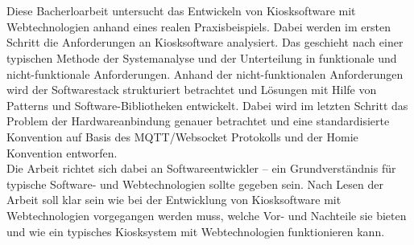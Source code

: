 \chapter{\abstractname}

Diese Bacherloarbeit untersucht das Entwickeln von Kiosksoftware mit Webtechnologien
anhand eines realen Praxisbeispiels. Dabei werden im ersten Schritt die Anforderungen
an Kiosksoftware analysiert. Das geschieht nach einer typischen Methode der Systemanalyse
und der Unterteilung in funktionale und nicht-funktionale Anforderungen. 
Anhand der nicht-funktionalen Anforderungen
wird der Softwarestack strukturiert betrachtet und Lösungen mit Hilfe von Patterns und 
Software-Bibliotheken entwickelt. Dabei wird im letzten Schritt das Problem der
Hardwareanbindung genauer betrachtet und eine standardisierte Konvention auf
Basis des MQTT/Websocket Protokolls und der Homie Konvention entworfen.\\
Die Arbeit richtet sich dabei an Softwareentwickler -- ein Grundverständnis für typische 
Software- und Webtechnologien sollte gegeben sein. Nach Lesen der Arbeit soll klar sein
wie bei der Entwicklung von Kiosksoftware mit Webtechnologien vorgegangen werden muss, welche
Vor- und Nachteile sie bieten und wie ein typisches Kiosksystem mit Webtechnologien funktionieren
kann. \\

\iffalse
- wie typische Anforderungen an Kiosksoftware mit Webtechnologien erfüllt werden können
- zum Beispiel Offline Verfügbarkeit und Geschlosssenheit 
\fi

